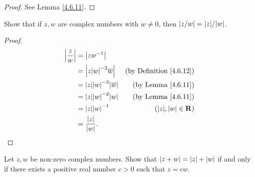 \begin{proof}
    See Lemma \ref{4.6.11}.
\end{proof}

\begin{exercise}\label{ex 4.6.7}
    Show that if \(z, w\) are complex numbers with \(w \neq 0\), then \(\abs*{z / w} = \abs*{z} / \abs*{w}\).
\end{exercise}

\begin{proof}
    \begin{align*}
        \abs*{\frac{z}{w}} & = \abs*{z w^{-1}}                                                                  \\
                           & = \abs*{z \abs*{w}^{-2} \overline{w}}        & \text{(by Definition \ref{4.6.12})} \\
                           & = \abs*{z} \abs*{w}^{-2} \abs*{\overline{w}} & \text{(by Lemma \ref{4.6.11})}      \\
                           & = \abs*{z} \abs*{w}^{-2} \abs*{w}            & \text{(by Lemma \ref{4.6.11})}      \\
                           & = \abs*{z} \abs*{w}^{-1}                     & (\abs*{z}, \abs*{w} \in \mathbf{R}) \\
                           & = \frac{\abs*{z}}{\abs*{w}}.
    \end{align*}
\end{proof}

\begin{exercise}\label{ex 4.6.8}
    Let \(z, w\) be non-zero complex numbers.
    Show that \(\abs*{z + w} = \abs*{z} + \abs*{w}\) if and only if there exists a positive real number \(c > 0\) such that \(z = cw\).
\end{exercise}

